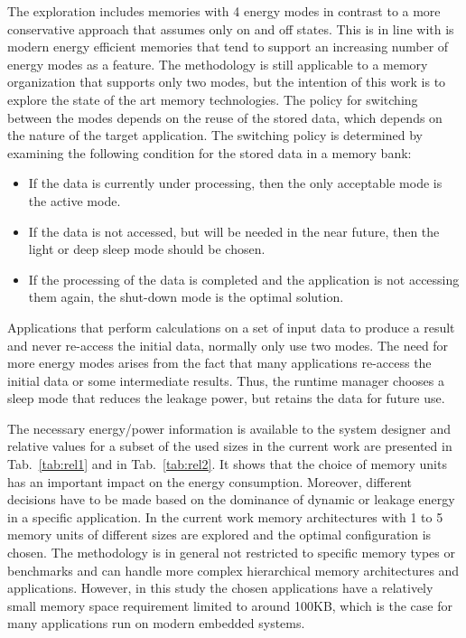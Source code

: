 The exploration includes memories with 4 energy modes in contrast to a more conservative approach that assumes only on and off states. 
This is in line with is modern energy efficient memories that tend to support an increasing number of energy modes as a feature. 
The methodology is still applicable to a memory organization that supports only two modes, but the intention of this work is to explore the state of the art memory technologies.
The policy for switching between the modes depends on the reuse of the stored data, which  depends on the nature of the target application.
The switching policy is determined by examining the following condition for the stored data in a memory bank:
\begin{itemize}
\item If the data is currently under processing, then the only acceptable mode is the active mode.
\item If the data is not accessed, but will be needed in the near future, then the light or deep sleep mode should be chosen.
\item If the processing of the data is completed and the application is not accessing them again, the shut-down mode is the optimal solution.
\end{itemize}

Applications that perform calculations on a set of input data to produce a result and never re-access the initial data, normally only use two modes.
The need for more energy modes arises from the fact that many applications re-access the initial data or some intermediate results.
Thus, the runtime manager chooses a sleep mode that reduces the leakage power, but retains the data for future use. 

The necessary energy/power information is available to the system designer and relative values for a subset of the used sizes in the current work are presented in Tab.~\ref{tab:rel1} and in Tab.~\ref{tab:rel2}. 
It shows that the choice of memory units has an important impact on the energy consumption. 
Moreover, different decisions have to be made based on the dominance of dynamic or leakage energy in a specific application. 
In the current work memory architectures with 1 to 5 memory units  of different sizes are explored and the optimal configuration is chosen. 
The methodology is in general not restricted to specific memory types or benchmarks and can handle more complex hierarchical memory architectures and applications. 
However, in this study the chosen applications have a relatively small memory space requirement limited to around 100KB, which is the case for many applications run on modern embedded systems. 

